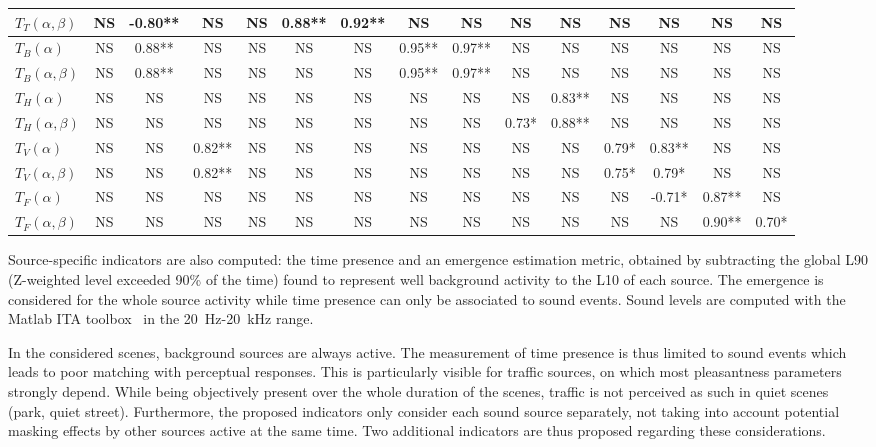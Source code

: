 \documentclass{article}
\begin{document}
\begin{sloppy}
\begin{table}[ht!]
{\begin{tabular}{ l | c c c c c c c c c c c c c c }
	$T_T(\alpha, \beta)$ & NS & -0.80** & NS & NS & 0.88** & 0.92** & NS & NS & NS & NS & NS & NS & NS & NS \\ \hline
	$T_B(\alpha)$ & NS & 0.88** & NS & NS & NS & NS & 0.95** & 0.97** & NS & NS & NS & NS & NS & NS \\
	$T_B(\alpha, \beta)$ & NS & 0.88** & NS & NS & NS & NS & 0.95** & 0.97** & NS & NS & NS & NS & NS & NS \\ \hline
	$T_H(\alpha)$ & NS & NS & NS & NS & NS & NS & NS & NS & NS & 0.83** & NS & NS & NS & NS \\
	$T_H(\alpha, \beta)$ & NS & NS & NS & NS & NS & NS & NS & NS & 0.73* & 0.88** & NS & NS & NS & NS \\ \hline
	$T_V(\alpha)$ & NS & NS & 0.82** & NS & NS & NS & NS & NS & NS & NS & 0.79* & 0.83** & NS & NS \\
	$T_V(\alpha, \beta)$ & NS & NS & 0.82** & NS & NS & NS & NS & NS & NS & NS & 0.75* & 0.79* & NS & NS \\ \hline
	$T_F(\alpha)$ & NS & NS & NS & NS & NS & NS & NS & NS & NS & NS & NS & -0.71* & 0.87** & NS \\
	$T_F(\alpha, \beta)$ & NS & NS & NS & NS & NS & NS & NS & NS & NS & NS & NS & NS & 0.90** & 0.70* \\ \hline
\end{tabular}
}
\end{table}

Source-specific indicators are also computed: the time presence and an emergence estimation metric, obtained by subtracting the global L90 (Z-weighted level exceeded 90\% of the time) found to represent well background activity to the L10 of each source. The emergence is considered for the whole source activity while time presence can only be associated to sound events. Sound levels are computed with the Matlab ITA toolbox~\cite{itatoolbox2017} in the 20~Hz-20~kHz range.

In the considered scenes, background sources are always active. The measurement of time presence is thus limited to sound events which leads to poor matching with perceptual responses. This is particularly visible for traffic sources, on which most pleasantness parameters strongly depend. While being objectively present over the whole duration of the scenes, traffic is not perceived as such in quiet scenes (park, quiet street). Furthermore, the proposed indicators only consider each sound source separately, not taking into account potential masking effects by other sources active at the same time. Two additional indicators are thus proposed regarding these considerations.


\end{sloppy}
\end{document}
